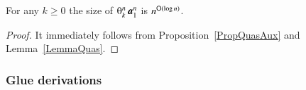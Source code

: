 \begin{theorem}\label{TheoQuas}
For any $k\ge0$ the size of\/ $\th kn\avec1n$ is $n^{{\mathsf O}(\log n)}$.
\end{theorem}

\begin{proof}
It immediately follows from Proposition~\ref{PropQuasAux} and Lemma~\ref{LemmaQuas}.
\end{proof}

\subsubsection{Glue derivations}

\newcommand{\Uth}[3]{\mathop{\mathsf\Upsilon_{#1,#2}^{#3}}}
\newcommand{\Dth}[3]{\mathop{\mathsf\Delta_{#1,#2}^{#3}}}
